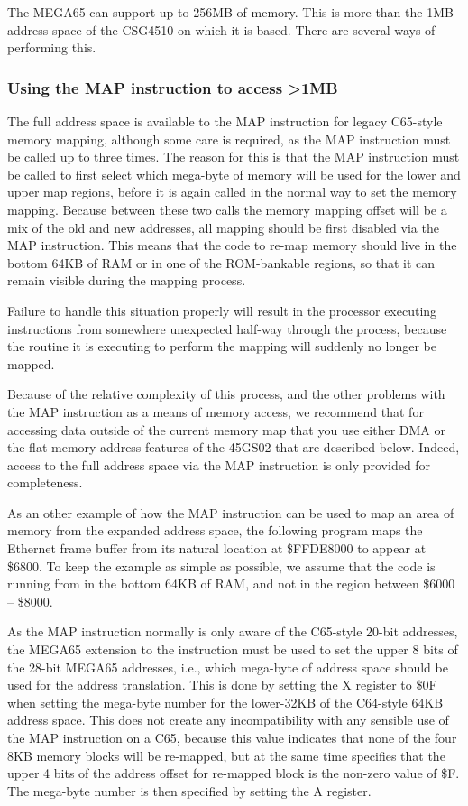 The MEGA65 can support up to 256MB of memory. This is more than the 1MB address space of the CSG4510
on which it is based. There are several ways of performing this.

\subsubsection{Using the MAP instruction to access >1MB}

The full address space is available to the MAP instruction for legacy C65-style memory
mapping, although some care is required, as the MAP instruction must be called up to three times.
The reason for this is that the MAP instruction must be called to first select which mega-byte of
memory will be used for the lower and upper map regions, before it is again called in the normal
way to set the memory mapping.  Because between these two calls the memory mapping offset will be
a mix of the old and new addresses, all mapping should be first disabled via the MAP instruction.
This means that the code to re-map memory should live in the bottom 64KB of RAM or in one of the
ROM-bankable regions, so that it can remain visible during the mapping process.

Failure to handle this situation properly will result in the processor executing instructions
from somewhere unexpected half-way through the process, because the routine it is executing
to perform the mapping will suddenly no longer be mapped.

Because of the relative complexity of this process, and the other problems with the MAP instruction
as a means of memory access, we recommend that for accessing data outside of the current memory
map that you use either DMA or the flat-memory address features of the 45GS02 that are described below.
Indeed, access to the full address space via the MAP instruction is only provided for completeness.

As an other example of how the MAP instruction can be used to map an area of memory from
the expanded address space, the following program maps the Ethernet frame buffer from its natural location
at \$FFDE8000 to appear at \$6800.  To keep the example as simple as possible, we assume that the code
is running from in the bottom 64KB of RAM, and not in the region between \$6000 -- \$8000.

As the MAP instruction normally is only aware of the C65-style 20-bit addresses, the MEGA65 extension to the
instruction must be used to set the upper 8 bits of the 28-bit MEGA65 addresses, i.e., which mega-byte of address
space should be used for the address translation.  This is done by setting the X
register to \$0F when setting the mega-byte number for the lower-32KB of the C64-style 64KB address space.
This does not create any incompatibility with any sensible use of the MAP instruction on a C65, because this
value indicates that none of the four 8KB memory blocks will be re-mapped, but at the same time specifies that
the upper 4 bits of the address offset for re-mapped block is the non-zero value of \$F.  The mega-byte number
is then specified by setting the A register.

